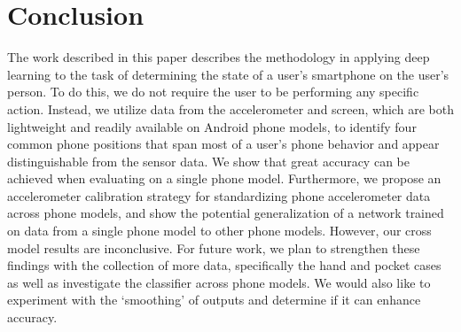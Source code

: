\section{Conclusion}
The work described in this paper describes the methodology in applying deep learning to the task of determining the state of a user's smartphone on the user's person. 
To do this, we do not require the user to be performing any specific action.
Instead, we utilize data from the accelerometer and screen, which are both lightweight and readily available on Android phone models, to identify four common phone positions that span most of a user's phone behavior
and appear distinguishable from the sensor data. 
We show that great accuracy can be achieved when evaluating on a single phone model.
Furthermore, we propose an accelerometer calibration strategy for standardizing phone accelerometer
data across phone models, and show the potential generalization of a network trained on data from a single phone model to other phone models.
 However, our cross model results are inconclusive. 
 For future work, we plan to strengthen these findings with the collection of more data, specifically the hand and pocket cases as well as investigate the classifier across phone models.
We would also like to experiment with the `smoothing' of outputs and determine if it can enhance accuracy.